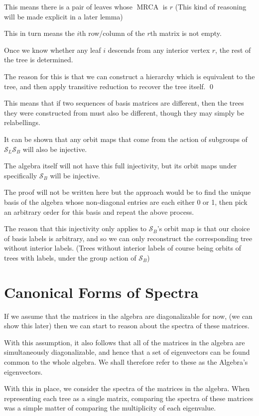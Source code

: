 \documentclass[10pt,a4paper]{report}
\DeclareMathOperator{\MRCA}{MRCA}
\newcommand{\Sym}{\mathcal{S}}
\begin{document}
This means there is a pair of leaves whose $\MRCA$ is $r$ (This kind of
reasoning will be made explicit in a later lemma)

This in turn means the $i$th row/column of the $r$th matrix is not empty.

Once we know whether any leaf $i$ descends from any interior vertex $r$, the
rest of the tree is determined.

The reason for this is that we can construct a hierarchy which is equivalent to
the tree, and then apply transitive reduction to recover the tree itself.
\qed{}

This means that if two sequences of basis matrices are different, then the
trees they were constructed from must also be different, though they may simply
be relabellings.

It can be shown that any orbit maps that come from the action of subgroups of
$\Sym_L\Sym_B$ will also be injective.

The algebra itself will not have this full injectivity, but its orbit maps
under specifically $\Sym_B$ will be injective.

The proof will not be written here but the approach would be to find the unique
basis of the algebra whose non-diagonal entries are each either 0 or 1, then
pick an arbitrary order for this basis and repeat the above process.

The reason that this injectivity only applies to $\Sym_B$'s orbit map is that
our choice of basis labels is arbitrary, and so we can only reconstruct the
corresponding tree without interior labels. (Trees without interior labels of
course being orbits of trees with labels, under the group action of $\Sym_B$)

\section{Canonical Forms of Spectra}

If we assume that the matrices in the algebra are diagonalizable for now, (we
can show this later) then we can start to reason about the spectra of these
matrices.

With this assumption, it also follows that all of the matrices in the algebra
are simultaneously diagonalizable, and hence that a set of eigenvectors can be
found common to the whole algebra.
We shall therefore refer to these as the Algebra's eigenvectors.

With this in place, we consider the spectra of the matrices in the algebra.
When representing each tree as a single matrix, comparing the spectra of these
matrices was a simple matter of comparing the multiplicity of each eigenvalue.
\end{document}
